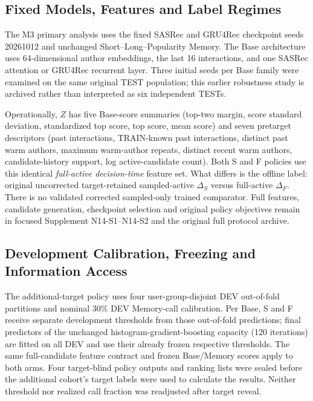 \documentclass[preprint,12pt]{elsarticle}
\begin{document}
\subsection{Fixed Models, Features and Label Regimes}
\label{sec:exp-comparators}

The M3 primary analysis uses the fixed SASRec and GRU4Rec checkpoint seeds 20261012 and unchanged Short--Long--Popularity Memory. The Base architecture uses 64-dimensional author embeddings, the last 16 interactions, and one SASRec attention or GRU4Rec recurrent layer. Three initial seeds per Base family were examined on the same original TEST population; this earlier robustness study is archived rather than interpreted as six independent TESTs.

Operationally, $Z$ has five Base-score summaries (top-two margin, score standard deviation, standardized top score, top score, mean score) and seven pretarget descriptors (past interactions, TRAIN-known past interactions, distinct past warm authors, maximum warm-author repeats, distinct recent warm authors, candidate-history support, log active-candidate count). Both S and F policies use this identical \emph{full-active decision-time} feature set. What differs is the offline label: original uncorrected target-retained sampled-active $\Delta_S$ versus full-active $\Delta_F$. There is no validated corrected sampled-only trained comparator. Full features, candidate generation, checkpoint selection and original policy objectives remain in focused Supplement N14-S1--N14-S2 and the original full protocol archive.

\subsection{Development Calibration, Freezing and Information Access}
\label{sec:exp-freeze}

The additional-target policy uses four user-group-disjoint DEV out-of-fold partitions and nominal 30\% DEV Memory-call calibration. Per Base, S and F receive separate development thresholds from those out-of-fold predictions; final predictors of the unchanged histogram-gradient-boosting capacity (120 iterations) are fitted on all DEV and use their already frozen respective thresholds. The same full-candidate feature contract and frozen Base/Memory scores apply to both arms. Four target-blind policy outputs and ranking lists were sealed before the additional cohort's target labels were used to calculate the results. Neither threshold nor realized call fraction was readjusted after target reveal.
\end{document}
